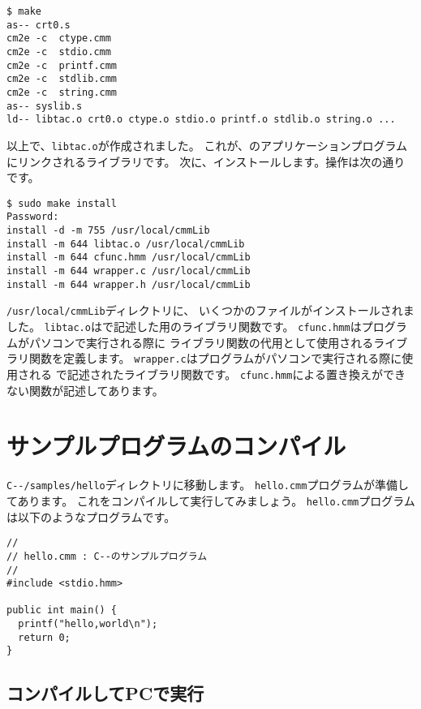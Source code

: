 \begin{mylist}
\begin{verbatim}
$ make
as-- crt0.s
cm2e -c  ctype.cmm
cm2e -c  stdio.cmm
cm2e -c  printf.cmm
cm2e -c  stdlib.cmm
cm2e -c  string.cmm
as-- syslib.s
ld-- libtac.o crt0.o ctype.o stdio.o printf.o stdlib.o string.o ...
\end{verbatim}
\end{mylist}

以上で、\verb;libtac.o;が作成されました。
これが、{\tacos}のアプリケーションプログラムにリンクされるライブラリです。
次に、インストールします。操作は次の通りです。

\begin{mylist}
\begin{verbatim}
$ sudo make install
Password:
install -d -m 755 /usr/local/cmmLib
install -m 644 libtac.o /usr/local/cmmLib
install -m 644 cfunc.hmm /usr/local/cmmLib
install -m 644 wrapper.c /usr/local/cmmLib
install -m 644 wrapper.h /usr/local/cmmLib
\end{verbatim}
\end{mylist}

\verb;/usr/local/cmmLib;ディレクトリに、
いくつかのファイルがインストールされました。
\verb;libtac.o;は{\cmml}で記述した{\tacos}用のライブラリ関数です。
\verb;cfunc.hmm;は{\cmm}プログラムがパソコンで実行される際に
{\cmml}ライブラリ関数の代用として使用される{\cl}ライブラリ関数を定義します。
\verb;wrapper.c;は{\cmm}プログラムがパソコンで実行される際に使用される
{\cl}で記述された{\cmm}ライブラリ関数です。
\verb;cfunc.hmm;による置き換えができない関数が記述してあります。

\section{サンプルプログラムのコンパイル}

\verb;C--/samples/hello;ディレクトリに移動します。
{\tt hello.cmm}プログラムが準備してあります。
これをコンパイルして実行してみましょう。
{\tt hello.cmm}プログラムは以下のような{\cmml}プログラムです。

\begin{mylist}
\begin{verbatim}
//
// hello.cmm : C--のサンプルプログラム
//
#include <stdio.hmm>

public int main() {
  printf("hello,world\n");
  return 0;
}
\end{verbatim}
\end{mylist}

\subsection{コンパイルしてPCで実行}

